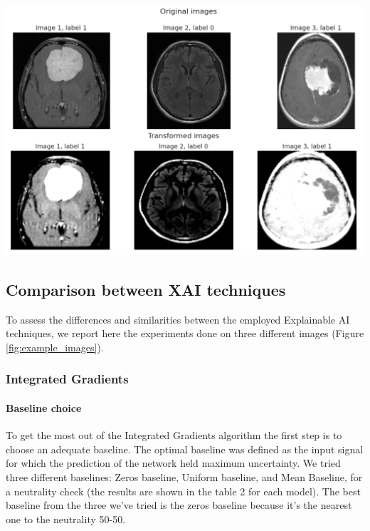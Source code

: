 \documentclass[11pt]{article}
\newenvironment{Figure}
  {\par\medskip\noindent\minipage{\linewidth}}
  {\endminipage\par\medskip}
\begin{document}
\begin{multicols*}{2}
\begin{Figure}
    \centering
    \includegraphics[width=\linewidth]{images/example_images_unified.png}
    \label{fig:example_images}
\end{Figure}

\subsection{Comparison between XAI techniques}
To assess the differences and similarities between the employed Explainable AI techniques, we report here the experiments done on three different images (Figure \ref{fig:example_images}).

\subsubsection{Integrated Gradients}
\paragraph{Baseline choice} 
To get the most out of the Integrated Gradients algorithm the first step is to choose an adequate baseline. The optimal baseline was defined as the input signal for which the prediction of the network held maximum uncertainty. We tried three different baselines: Zeros baseline, Uniform baseline, and Mean Baseline, for a neutrality check (the results are shown in the table 2 for each model). The best baseline from the three we've tried is the zeros baseline because it's the nearest one to the neutrality 50-50.


\end{multicols*}
\end{document}
